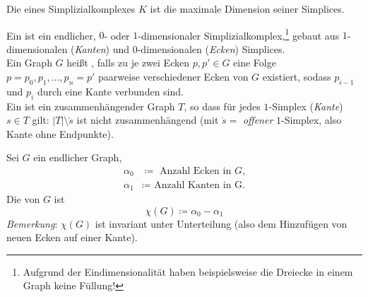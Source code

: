 \begin{definition}[Dimension]
  Die  eines Simplizialkomplexes $ K $ ist die maximale Dimension seiner Simplices.
\end{definition}

\begin{remark}
  Ein \label{def:graph} ist ein endlicher, $ 0 $- oder $ 1 $-dimensionaler Simplizialkomplex,\footnote{Aufgrund der Eindimensionalität haben beispielsweise die Dreiecke in einem Graph keine Füllung!} gebaut aus $ 1 $-dimensionalen (\emph{Kanten}) und $ 0 $-dimensionalen (\emph{Ecken}) Simplices. \\
  Ein Graph $ G $ heißt \label{def:zusammenhaengend}, falls zu je zwei Ecken $ p, p' \in G $ eine Folge $ p = p_0, p_1, \dots, p_n = p' $ paarweise verschiedener Ecken von $ G $ existiert, sodass $ p_{i-1} $ und $ p_i $ durch eine Kante verbunden sind. \\
  Ein \label{def:baum} ist ein zusammenhängender Graph $ T $, so dass für jedes $ 1 $-Simplex (\emph{Kante}) $ s \in T $ gilt: $ \vert T \vert \setminus \mathring{s} $ ist nicht zusammenhängend (mit $ \mathring{s} = $ \emph{offener} $ 1 $-Simplex, also Kante ohne Endpunkte).
\end{remark}

\begin{definition}
  Sei $ G $ ein endlicher Graph,
  \begin{align*}
    \alpha_0 &\coloneqq \text{ Anzahl Ecken in } G\text{,} \\
    \alpha_1 &\coloneqq \text{ Anzahl Kanten in } \text{G.}
  \end{align*}
  Die \label{def:eulerCharakteristik} von $ G $ ist
  \begin{equation*}
    \chi(G) \coloneqq \alpha_0 - \alpha_1
  \end{equation*}
  \emph{Bemerkung}: $ \chi(G) $ ist invariant unter Unterteilung (also dem Hinzufügen von neuen Ecken auf einer Kante).
\end{definition}

